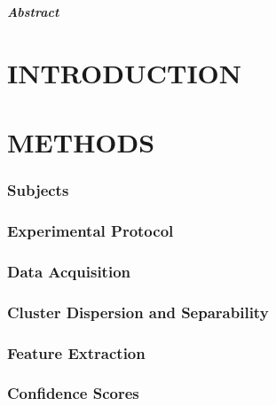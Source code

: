 \begin{multicols}{2}
	
	
	\textbf{\textit{Abstract} 
		}
	
	
	\section*{INTRODUCTION}%
	
	
	
	
	\section*{METHODS}%
	
	\subsubsection*{Subjects}
	
	
	
	\subsubsection*{Experimental Protocol}
	
	
	
	\subsubsection*{Data Acquisition}
	
	
	\subsubsection*{Cluster Dispersion and Separability} 
	
	
	\subsubsection*{Feature Extraction}
	
	
	\subsubsection*{Confidence Scores} 
	 
	

\end{multicols}

